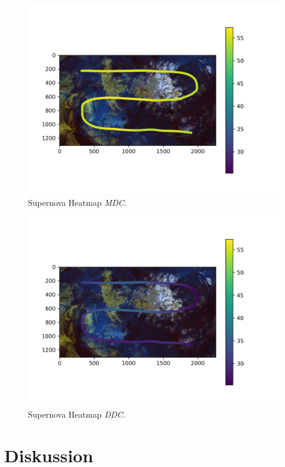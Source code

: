 \begin{figure}
	\centering
	\includegraphics[width=1\textwidth]{../../Grafiken/results/performance/supernova/ms_data_mdc_heatmap.png}
	\caption{Supernova Heatmap \emph{MDC}.}
	\label{fig::res::pf::hm_sn_mdc}
\end{figure}
\begin{figure}
	\centering
	\includegraphics[width=1\textwidth]{../../Grafiken/results/performance/supernova/ms_data_ddc_heatmap.png}
	\caption{Supernova Heatmap \emph{DDC}.}
	\label{fig::res::pf::hm_sn_ddc}
\end{figure}

\cleardoublepage

\section*{Diskussion}\label{sec::disc}
